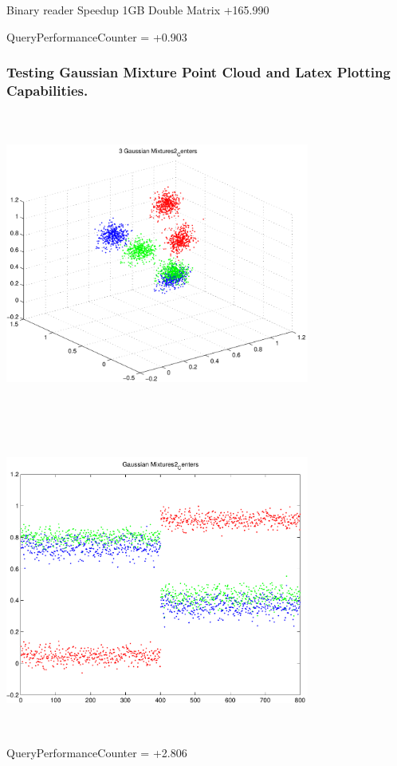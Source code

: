 \documentclass[9pt]{article}
\theoremstyle{plain}
\theoremstyle{definition}
\theoremstyle{remark}
\numberwithin{equation}{section}
\begin{document}
Binary reader Speedup 1GB Double Matrix +165.990

QueryPerformanceCounter  =  +0.903
\subsubsection{Testing Gaussian Mixture Point Cloud and Latex Plotting Capabilities.}
\includegraphics[width=10.0cm,height=10.0cm]{GaussianMixture_Dim_3_Centers2.pdf}

\includegraphics[width=10.0cm,height=10.0cm]{GaussianMixture_Dim_1_Centers2.pdf}

QueryPerformanceCounter  =  +2.806
\end{document}
